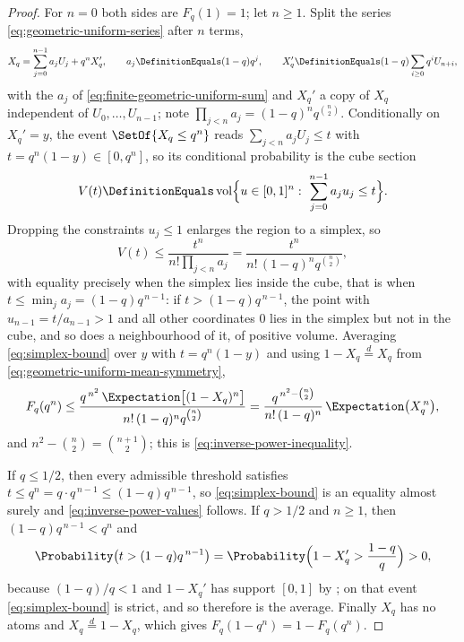 \documentclass[11pt,a4paper,oneside,openany]{book}
\theoremstyle{definition}
\theoremstyle{remark}
\begin{document}
\begin{proof}
For $n=0$ both sides are $F_q(1)=1$; let $n\ge1$.  Split the series
\eqref{eq:geometric-uniform-series} after $n$ terms,
\begin{equation}\label{eq:inverse-power-split}
 X_q=\sum_{j=0}^{n-1}a_jU_j+q^nX_q',
 \qquad a_j\DefinitionEquals(1-q)q^j,
 \qquad X_q'\DefinitionEquals(1-q)\sum_{i\ge0}q^iU_{n+i},
\end{equation}
with the $a_j$ of \eqref{eq:finite-geometric-uniform-sum} and $X_q'$ a copy of $X_q$
independent of $U_0,\ldots,U_{n-1}$; note $\prod_{j<n}a_j=(1-q)^nq^{\binom n2}$.
Conditionally on $X_q'=y$, the event $\SetOf{X_q\le q^n}$ reads $\sum_{j<n}a_jU_j\le t$
with $t=q^n(1-y)\in[0,q^n]$, so its conditional probability is the cube section
\[
 V(t)\DefinitionEquals\operatorname{vol}
 \Bigl\{u\in[0,1]^n:\ \sum_{j=0}^{n-1}a_ju_j\le t\Bigr\}.
\]
Dropping the constraints $u_j\le1$ enlarges the region to a simplex, so
\begin{equation}\label{eq:simplex-bound}
 V(t)\le\frac{t^n}{n!\prod_{j<n}a_j}
      =\frac{t^n}{n!\,(1-q)^nq^{\binom n2}},
\end{equation}
with equality precisely when the simplex lies inside the cube, that is when
$t\le\min_ja_j=(1-q)q^{\,n-1}$: if $t>(1-q)q^{\,n-1}$, the point with
$u_{n-1}=t/a_{n-1}>1$ and all other coordinates $0$ lies in the simplex but not in the
cube, and so does a neighbourhood of it, of positive volume.  Averaging
\eqref{eq:simplex-bound} over $y$ with $t=q^n(1-y)$ and using
$1-X_q\overset d=X_q$ from \eqref{eq:geometric-uniform-mean-symmetry},
\[
 F_q(q^n)\le\frac{q^{\,n^2}\,\Expectation\bigl[(1-X_q)^n\bigr]}
                 {n!\,(1-q)^nq^{\binom n2}}
 =\frac{q^{\,n^2-\binom n2}}{n!\,(1-q)^n}\,\Expectation\bigl(X_q^{\,n}\bigr),
\]
and $n^2-\binom n2=\binom{n+1}{2}$; this is \eqref{eq:inverse-power-inequality}.

If $q\le1/2$, then every admissible threshold satisfies
$t\le q^n=q\cdot q^{\,n-1}\le(1-q)q^{\,n-1}$, so \eqref{eq:simplex-bound} is an equality
almost surely and \eqref{eq:inverse-power-values} follows.  If $q>1/2$ and $n\ge1$, then
$(1-q)q^{\,n-1}<q^n$ and
\[
 \Probability\bigl(t>(1-q)q^{\,n-1}\bigr)
 =\Probability\Bigl(1-X_q'>\frac{1-q}q\Bigr)>0,
\]
because $(1-q)/q<1$ and $1-X_q'$ has support $[0,1]$ by
; on that event \eqref{eq:simplex-bound} is strict, and
so therefore is the average.  Finally $X_q$ has no atoms and $X_q\overset d=1-X_q$, which
gives $F_q(1-q^n)=1-F_q(q^n)$.
\end{proof}
\end{document}
